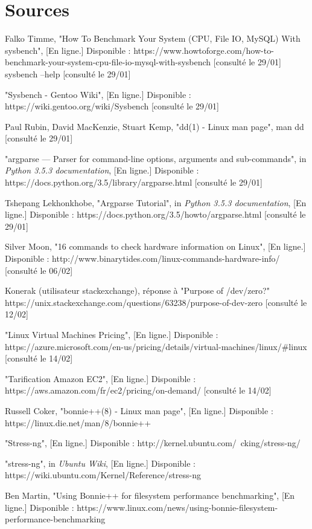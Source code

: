 \chapter{Sources}

Falko Timme, "How To Benchmark Your System (CPU, File IO, MySQL) With sysbench", [En ligne.] Disponible : https://www.howtoforge.com/how-to-benchmark-your-system-cpu-file-io-mysql-with-sysbench [consulté le 29/01]
sysbench --help [consulté le 29/01]

"Sysbench - Gentoo Wiki", [En ligne.] Disponible : \\ https://wiki.gentoo.org/wiki/Sysbench [consulté le 29/01]

Paul Rubin, David MacKenzie, Stuart Kemp, "dd(1) - Linux man page", man dd [consulté le 29/01]

"argparse — Parser for command-line options, arguments and sub-commands", in \textit{Python 3.5.3 documentation}, [En ligne.] Disponible : \\ https://docs.python.org/3.5/library/argparse.html [consulté le 29/01]

Tshepang Lekhonkhobe, "Argparse Tutorial", in \textit{Python 3.5.3 documentation}, [En ligne.] Disponible : https://docs.python.org/3.5/howto/argparse.html [consulté le 29/01]

Silver Moon, "16 commands to check hardware information on Linux", [En ligne.] Disponible : http://www.binarytides.com/linux-commands-hardware-info/ [consulté le 06/02]

Konerak (utilisateur stackexchange), réponse à "Purpose of /dev/zero?" https://unix.stackexchange.com/questions/63238/purpose-of-dev-zero [consulté le 12/02]

"Linux Virtual Machines Pricing", [En ligne.] Disponible : \\ https://azure.microsoft.com/en-us/pricing/details/virtual-machines/linux/\#linux [consulté le 14/02]

"Tarification Amazon EC2", [En ligne.] Disponible : \\ https://aws.amazon.com/fr/ec2/pricing/on-demand/ [consulté le 14/02]

Russell Coker, "bonnie++(8) - Linux man page", [En ligne.] Disponible : https://linux.die.net/man/8/bonnie++

"Stress-ng", [En ligne.] Disponible : http://kernel.ubuntu.com/~cking/stress-ng/

"stress-ng", in \textit{Ubuntu Wiki}, [En ligne.] Disponible : \\ https://wiki.ubuntu.com/Kernel/Reference/stress-ng

Ben Martin, "Using Bonnie++ for filesystem performance benchmarking", [En ligne.] Disponible : https://www.linux.com/news/using-bonnie-filesystem-performance-benchmarking